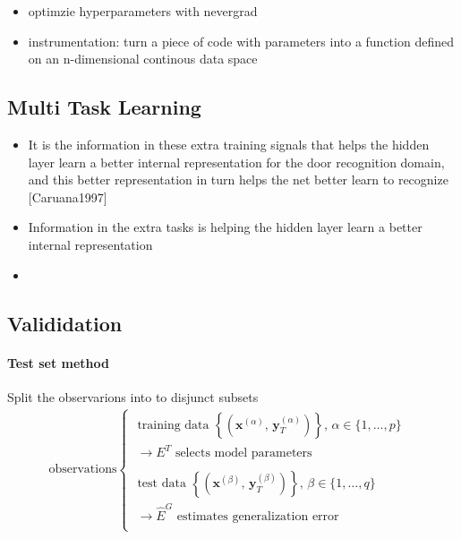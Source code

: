 \documentclass{scrartcl}
\begin{document}
\begin{itemize}
\item optimzie hyperparameters with nevergrad
\item instrumentation: turn a piece of code with parameters into a function defined on an n-dimensional continous data space
\end{itemize}


\subsection{Multi Task Learning}

\begin{itemize}
\item It is the information in these extra training signals that helps the hidden layer learn a better internal representation for the door recognition domain, and this better representation in turn helps the net better learn to recognize [Caruana1997]
\item Information in the extra tasks is helping the hidden layer learn a better internal representation
\item 
\end{itemize}



\subsection{Valididation}

\paragraph{Test set method} Split the observarions into to disjunct subsets 
\begin{align*}
\text{observations}
\begin{cases}
    \text{ training data } \left\{ \left(\mathbf x^{(\alpha)}, \,\mathbf y_T^{(\alpha)}\right) \right \}, \, \alpha \in \{1,\dots, p\} & \\ 
    \;\rightarrow E^T \text{ selects model parameters} & \\  \\
    \text{ test data } \left\{ \left(\mathbf x^{(\beta)}, \,\mathbf y_T^{(\beta)}\right) \right \}, \, \beta \in \{1,\dots, q\} & \\    
    \;\rightarrow \widehat{E}^G \text{ estimates generalization error} & \\ 
\end{cases}
\end{align*} 
\end{document}
